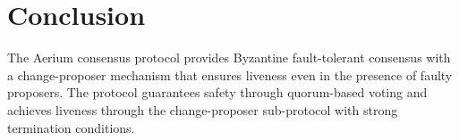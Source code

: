 \documentclass[11pt,a4paper,twoside]{article}
\begin{document}
\section{Conclusion}

The Aerium consensus protocol provides Byzantine fault-tolerant consensus with a change-proposer mechanism that ensures liveness even in the presence of faulty proposers. The protocol guarantees safety through quorum-based voting and achieves liveness through the change-proposer sub-protocol with strong termination conditions.
\end{document}
